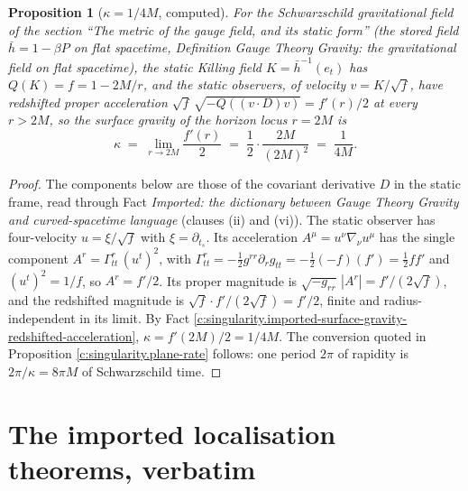 \documentclass[11pt]{article}
\newtheorem{proposition}[theorem]{Proposition}
\theoremstyle{definition}
\theoremstyle{plain}
\newcommand{\changedmark}[2]{\marginpar{\raggedright\scriptsize\color{#1}#2}}
\providecommand{\hb}{}\renewcommand{\hb}{\bar{h}}
\begin{document}
\begin{proposition}[$\kappa = 1/4M$, computed]\label{c:singularity.computed}
\changedmark{gray}{reworded}
For the Schwarzschild gravitational field of the section ``The metric of the gauge field, and its static form'' (the stored field $\hb = 1 - \beta P$ on flat spacetime, Definition \emph{Gauge Theory Gravity: the gravitational field on flat spacetime}), the static Killing field $K = \hb^{-1}(e_t)$ has $Q(K) = f = 1 - 2M/r$, and the static observers, of velocity $v = K/\sqrt f$, have redshifted proper acceleration $\sqrt f\,\sqrt{-Q((v \cdot D)v)} = f'(r)/2$ at every $r > 2M$, so the surface gravity of the horizon locus $r = 2M$ is
\[
\kappa \;=\; \lim_{r \to 2M} \frac{f'(r)}{2} \;=\; \frac{1}{2}\cdot\frac{2M}{(2M)^2} \;=\; \frac{1}{4M} .
\]
\end{proposition}
\begin{proof}
The components below are those of the covariant derivative $D$ in the static frame, read through Fact \emph{Imported: the dictionary between Gauge Theory Gravity and curved-spacetime language} (clauses (ii) and (vi)). The static observer has four-velocity $u = \xi/\sqrt f$ with $\xi = \partial_{t_s}$. Its acceleration $A^\mu = u^\nu \nabla_\nu u^\mu$ has the single component $A^r = \Gamma^r_{tt}\,(u^t)^2$, with $\Gamma^r_{tt} = -\tfrac12 g^{rr}\partial_r g_{tt} = -\tfrac12(-f)(f') = \tfrac12 f f'$ and $(u^t)^2 = 1/f$, so $A^r = f'/2$. Its proper magnitude is $\sqrt{-g_{rr}}\,|A^r| = f'/(2\sqrt f)$, and the redshifted magnitude is $\sqrt f \cdot f'/(2\sqrt f) = f'/2$, finite and radius-independent in its limit. By Fact \ref{c:singularity.imported-surface-gravity-redshifted-acceleration}, $\kappa = f'(2M)/2 = 1/4M$. The conversion quoted in Proposition \ref{c:singularity.plane-rate} follows: one period $2\pi$ of rapidity is $2\pi/\kappa = 8\pi M$ of Schwarzschild time.

\end{proof}

\section{The imported localisation theorems, verbatim}
\end{document}

